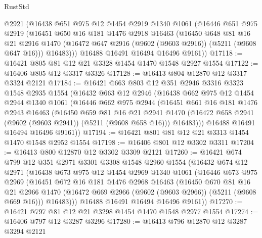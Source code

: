 \begin{lexlean}{RustStd}
\begin{coremodule}
      @2921
      (@16438
        @651
        @975
        @12
        @1454
        @2919
        @1340
        @1061
        (@16446
          @651
          @975
          @2919
          (@16451
            @650
            @16
            @181
            @1476
            @2918
            @16463
            (@16450
              @648
              @81
              @16
              @21
              @2916
              @1470
              (@16472 @647 @2916 (@9602 (@9603 @2916)) (@5211 (@9608 @647 @16)))
              @16483)))
        @16488
        @16491
        @16494
        @16496
        @9161))
@17118 := @16421 @805 @81 @12 @21 @3328 @1454 @1470 @1548 @2927 @1554
@17122 := @16406 @805 @12 @3317 @3326
@17128 := @16413 @804 @12870 @12 @3317 @3324 @2121
@17184 := @16421
    @663
    @803
    @12
    @351
    @2946
    @3316
    @3323
    @1548
    @2935
    @1554
    (@16432
      @663
      @12
      @2946
      (@16438
        @662
        @975
        @12
        @1454
        @2944
        @1340
        @1061
        (@16446
          @662
          @975
          @2944
          (@16451
            @661
            @16
            @181
            @1476
            @2943
            @16463
            (@16450
              @659
              @81
              @16
              @21
              @2941
              @1470
              (@16472 @658 @2941 (@9602 (@9603 @2941)) (@5211 (@9608 @658 @16)))
              @16483)))
        @16488
        @16491
        @16494
        @16496
        @9161))
@17194 := @16421 @801 @81 @12 @21 @3313 @1454 @1470 @1548 @2952 @1554
@17198 := @16406 @801 @12 @3302 @3311
@17204 := @16413 @800 @12870 @12 @3302 @3309 @2121
@17260 := @16421
    @674
    @799
    @12
    @351
    @2971
    @3301
    @3308
    @1548
    @2960
    @1554
    (@16432
      @674
      @12
      @2971
      (@16438
        @673
        @975
        @12
        @1454
        @2969
        @1340
        @1061
        (@16446
          @673
          @975
          @2969
          (@16451
            @672
            @16
            @181
            @1476
            @2968
            @16463
            (@16450
              @670
              @81
              @16
              @21
              @2966
              @1470
              (@16472 @669 @2966 (@9602 (@9603 @2966)) (@5211 (@9608 @669 @16)))
              @16483)))
        @16488
        @16491
        @16494
        @16496
        @9161))
@17270 := @16421 @797 @81 @12 @21 @3298 @1454 @1470 @1548 @2977 @1554
@17274 := @16406 @797 @12 @3287 @3296
@17280 := @16413 @796 @12870 @12 @3287 @3294 @2121

\end{coremodule}
\end{lexlean}
